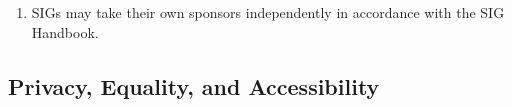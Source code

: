 \begin{enumerate}
\begin{enumerate}
        \item If a sponsor could otherwise be considered controversial - as described above - they may still be deemed controversial.
        \item These characteristics are also enumarated under our Privacy, Equality and Accessibility policy.
        \item However, if a sponsors engages in discrimination against any of these characteristics they are certainly controversial.
    \end{enumerate}
    \item SIGs may take their own sponsors independently in accordance with the SIG Handbook.
\end{enumerate}

\subsection{Privacy, Equality, and Accessibility}

